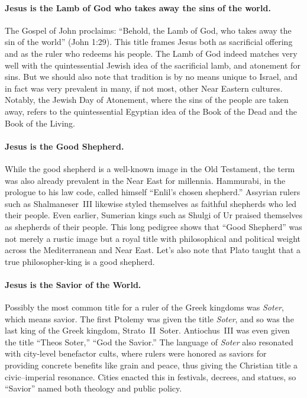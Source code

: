 \paragraph{Jesus is the Lamb of God who takes away the sins of the world.}\label{par:jesus-is-the-lamb-of-god-who-takes-away-the-sins-of-the-world.}
The Gospel of John proclaims: “Behold, the Lamb of God, who takes away the sin of the world” (John 1:29).
This title frames Jesus both as sacrificial offering and as the ruler who redeems his people.
The Lamb of God indeed matches very well with the quintessential Jewish idea of the sacrificial lamb, and atonement for sins.
But we should also note that tradition is by no means unique to Israel, and in fact was very prevalent in many, if not most, other Near Eastern cultures.
Notably, the Jewish Day of Atonement, where the sins of the people are taken away, refers to the quintessential Egyptian idea of the Book of the Dead and the Book of the Living.

\paragraph{Jesus is the Good Shepherd.}\label{par:jesus-is-the-good-shepherd.}
While the good shepherd is a well-known image in the Old Testament, the term was also already prevalent in the Near East for millennia.
Hammurabi, in the prologue to his law code, called himself “Enlil’s chosen shepherd.”
Assyrian rulers such as Shalmaneser~III likewise styled themselves as faithful shepherds who led their people.
Even earlier, Sumerian kings such as Shulgi of Ur praised themselves as shepherds of their people.
This long pedigree shows that “Good Shepherd” was not merely a rustic image but a royal title with philosophical and political weight across the Mediterranean and Near East.
Let's also note that Plato taught that a true philosopher-king is a good shepherd.

\paragraph{Jesus is the Savior of the World.}\label{par:jesus-is-the-savior-of-the-world.}
Possibly the most common title for a ruler of the Greek kingdoms was \emph{Soter}, which means savior.
The first Ptolemy was given the title \emph{Soter}, and so was the last king of the Greek kingdom, Strato~II~Soter.
Antiochus~III was even given the title “Theos Soter,” “God the Savior.”
The language of \emph{Soter} also resonated with city-level benefactor cults, where rulers were honored as saviors for providing concrete benefits like grain and peace, thus giving the Christian title a civic–imperial resonance.
Cities enacted this in festivals, decrees, and statues, so “Savior” named both theology and public policy.

